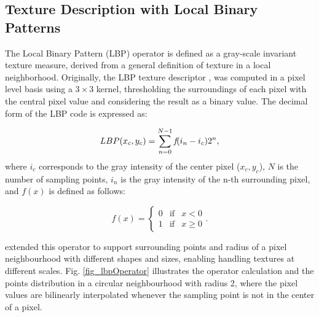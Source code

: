 \begin{appendices}
\chapter{Texture Description with Local Binary Patterns}
\label{AppendixA}

The Local Binary Pattern (LBP) operator is defined as a gray-scale invariant texture measure, derived from a general definition of texture in a local neighborhood. Originally, the LBP texture descriptor \cite{ojala1996comparative}, was computed in a pixel level basis using a $3 \times 3$ kernel, thresholding the surroundings of each pixel with the central pixel value and considering the result as a binary value. The decimal form of the LBP code is expressed as:

\begin{equation}
LBP(x_{c},y_{c})=\displaystyle\sum\limits_{n=0}^{N-1} \emph{f}(i_{n}-i_{c})2^n,
\label{eq:LBP}
\end{equation}
\noindent where $i_{c}$ corresponds to the gray intensity of the center pixel ($x_{c}, y_{c}$), $N$ is the number of sampling points, $i_{n}$ is the gray intensity of the n-th surrounding pixel, and $f(x)$ is defined as follows:

\begin{equation}
f(x)  =
\left\lbrace \begin{array}{ccc}
0 & \mbox{if} & x<0 \\
1 & \mbox{if} & x\geq0 
\end{array}. \right.
\label{eq:fx}
\end{equation}

\cite{ojala2002multiresolution} extended this operator to support surrounding points and radius of a pixel neighbourhood with different shapes and sizes, enabling handling textures at different scales. Fig. \ref{fig_lbpOperator} illustrates the operator calculation and the points distribution in a circular neighbourhood with radius 2, where the pixel values are bilinearly interpolated whenever the sampling point is not in the center of a pixel.


\end{appendices}

